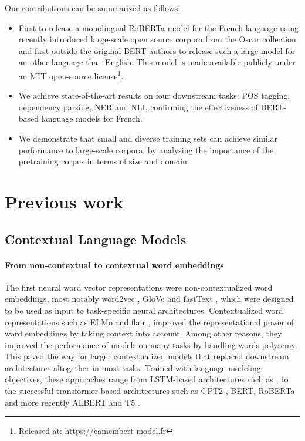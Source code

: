\documentclass[11pt,a4paper]{article}
\newcommand{\roberta}{RoBERTa\xspace}
\newcommand{\bert}{BERT\xspace}
\begin{document}
Our contributions can be summarized as follows:
\begin{itemize}
    \item First to release a monolingual \roberta model for the French language using recently introduced large-scale open source corpora from the Oscar collection and first outside the original \bert authors to release such a large model for an other language than English. This model is made available publicly under an MIT open-source license\footnote{Released at:
    \mbox{\url{https://camembert-model.fr}}}.
    \item We achieve state-of-the-art results on four downstream tasks: POS tagging, dependency parsing, NER and NLI, confirming the effectiveness of \bert-based language models for French.
    \item We demonstrate that small and diverse training sets can achieve similar performance to large-scale corpora, by analysing the importance of the pretraining corpus in terms of size and domain.\end{itemize}




\section{Previous work}
\label{relatedwork}
\subsection{Contextual Language Models}
\paragraph{From non-contextual to contextual word embeddings}
The first neural word vector representations were non-contextualized word embeddings, most notably
 word2vec \cite{mikolov2013distributed}, GloVe \cite{pennington2014glove} and fastText \cite{mikolov2018advances}, which were designed to be used as input to task-specific neural architectures.
 Contextualized word representations such as ELMo \cite{peters2018deep} and flair \cite{akbik2018contextual}, improved the representational power of word embeddings by taking context into account. Among other reasons, they improved the performance of models on many tasks by handling words polysemy.
 This paved the way for larger contextualized models that replaced downstream architectures altogether in most tasks. Trained with language modeling objectives, these approaches range from LSTM-based architectures such as \cite{dai2015semisupervised}, to the successful transformer-based architectures such
 as GPT2 \cite{radford2019language}, \bert \cite{devlin2019bert}, \roberta \cite{liu2019roberta} and more recently ALBERT \cite{lan2019albert} and T5 \cite{raffel2019exploring}.
\end{document}
